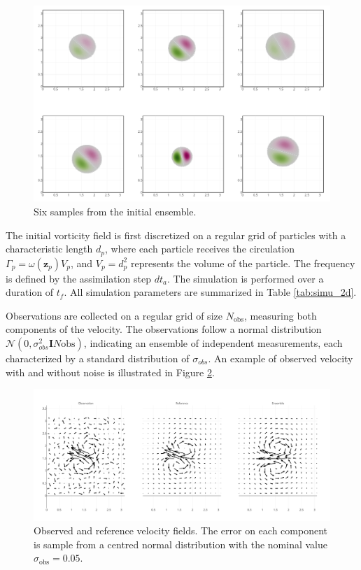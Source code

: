 \begin{figure}[ht]
	\centering
	\includegraphics[width=0.7\linewidth]{images/app2d/ensemble_sample.png}
	\caption{Six samples from the initial ensemble.}
	\label{fig:sample_ens}
\end{figure}

The initial vorticity field is first discretized on a regular grid of particles with a characteristic length $d_p$, where each particle receives the circulation $\Gamma_p = \omega(\bm z_p) V_p$, and $V_p = d_p^2$ represents the volume of the particle. The frequency is defined by the assimilation step $dt_a$. The simulation is performed over a duration of $t_f$. All simulation parameters are summarized in Table \ref{tab:simu_2d}.

Observations are collected on a regular grid of size $N_{\text{obs}}$, measuring both components of the velocity. The observations follow a normal distribution $\mathcal N(0, \sigma_{obs}^2 \bm{I}{N{\text{obs}}})$, indicating an ensemble of independent measurements, each characterized by a standard distribution of $\sigma_{obs}$. An example of observed velocity with and without noise is illustrated in Figure \ref{fig:velocity}.

\begin{figure}[htbp]
	\centering
	\includegraphics[width=0.8\linewidth]{images/app2d/velocity_ref.pdf}
	\caption{Observed and reference velocity fields. The error on each component is sample from a centred normal distribution with the nominal value $\sigma_{\text{obs}} = 0.05$.}
	\label{fig:velocity}
\end{figure}

